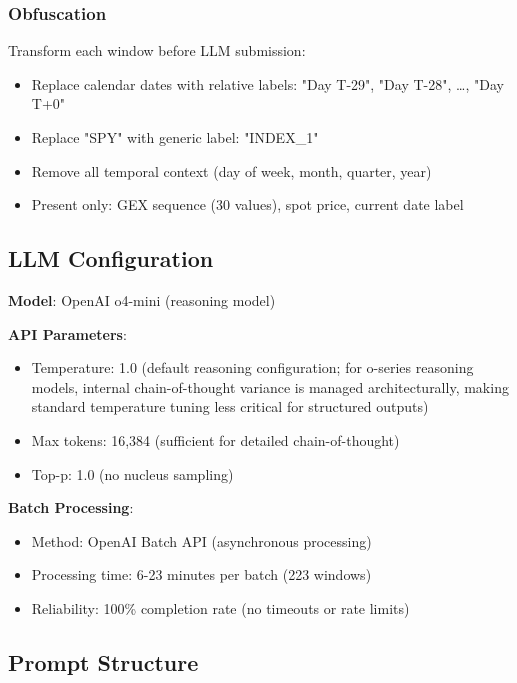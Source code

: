 \subsubsection{Obfuscation}

Transform each window before LLM submission:
\begin{itemize}
\item Replace calendar dates with relative labels: "Day T-29", "Day T-28", \ldots, "Day T+0"
\item Replace "SPY" with generic label: "INDEX\_1"
\item Remove all temporal context (day of week, month, quarter, year)
\item Present only: GEX sequence (30 values), spot price, current date label
\end{itemize}

\subsection{LLM Configuration}

\textbf{Model}: OpenAI o4-mini (reasoning model)

\textbf{API Parameters}:
\begin{itemize}
\item Temperature: 1.0 (default reasoning configuration; for o-series reasoning models, internal chain-of-thought variance is managed architecturally, making standard temperature tuning less critical for structured outputs)
\item Max tokens: 16,384 (sufficient for detailed chain-of-thought)
\item Top-p: 1.0 (no nucleus sampling)
\end{itemize}

\textbf{Batch Processing}:
\begin{itemize}
\item Method: OpenAI Batch API (asynchronous processing)
\item Processing time: 6-23 minutes per batch (223 windows)
\item Reliability: 100\% completion rate (no timeouts or rate limits)
\end{itemize}

\subsection{Prompt Structure}

